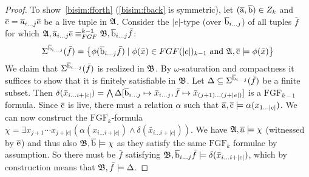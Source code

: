 \begin{proof}
  To show~\ref{bisim:fforth} (\ref{bisim:fback} is symmetric), let $(\overline{\mathrm{a}}, \overline{\mathrm{b}}) \in Z_{k}$ and $\overline{\mathrm{c}} = \overline{\mathrm{a}}_{i\ldots{}j}\overline{\mathrm{e}}$ be a live tuple in ${\mathfrak{A}}$.
  Consider the $|e|$-type (over $\overline{\mathrm{b}}_{i\ldots{}j}$) of all tuples $\bar{f}$ for which $\str{A}, \elemtuplea_{i\ldots{}j}\elemtuplee \equiv_{\FGF}^{k-1} \str{B}, \elemtupleb_{i\ldots{j}}\bar{f}$:
  \begin{align*}
    \Sigma^{\elemtupleb_{i\ldots{j}}}(\bar{f}) = \left\{ \phi(\elemtupleb_{i\ldots{}j}\bar{f}) \mid \phi(\bar{x}) \in {\FGF(|c|)_{k-1}}\ \text{and}\ \str{A}, \elemtuplec \models \phi(\bar{x}) \right\}
  \end{align*}
  We claim that $\Sigma^{\overline{\mathrm{b}}_{i\ldots{}j}}(\bar{f})$ is realized in ${\mathfrak{B}}$.
  By $\omega$-saturation and compactness it suffices to show that it is finitely satisfiable in ${\mathfrak{B}}$.
  Let $\Delta \subseteq \Sigma^{\overline{\mathrm{b}}_{i\ldots{}j}}(\bar{f})$ be a finite subset.
  Then $\delta(\bar{x}_{i\ldots{}i+|c|}) = \bigwedge \Delta[\overline{\mathrm{b}}_{i\ldots{}j} \mapsto \bar{x}_{i\ldots{}j}, \bar{f} \mapsto \bar{x}_{(j+1)\ldots{}(j+|e|)}]$ is a $\mathrm{FGF}_{k-1}$ formula.
  Since $\overline{\mathrm{c}}$ is live, there must a relation $\alpha$ such that $\overline{\mathrm{a}}, \overline{\mathrm{c}} \models \alpha(x_{1\ldots{}|c|})$.
  We can now construct the $\mathrm{FGF}_{k}$-formula $\chi = \exists{x_{j+1}\cdots{}x_{j+|e|}} (\alpha(x_{i\ldots{}i+|c|}) \land \delta(\bar{x}_{i\ldots{}i+|c|}))$.
  We have ${\mathfrak{A}}, \overline{\mathrm{a}} \models \chi$ (witnessed by $\overline{\mathrm{e}}$) and thus also ${\mathfrak{B}}, \overline{\mathrm{b}} \models \chi$ as they satisfy the same $\mathrm{FGF}_{k}$ formulae by assumption.
  So there must be $\bar{f}$ satisfying ${\mathfrak{B}}, \overline{\mathrm{b}}_{i\ldots{}j}\bar{f} \models \delta(\bar{x}_{i\ldots{}i+|c|})$, which by construction means that ${\mathfrak{B}}, \bar{f} \models \Delta$.
\end{proof}